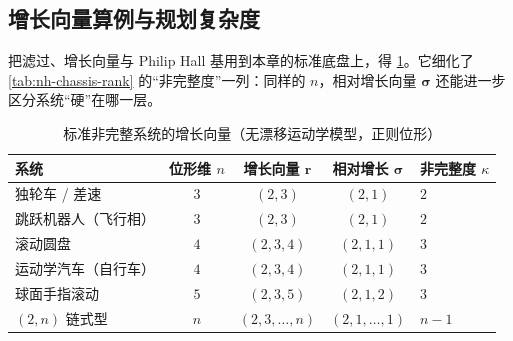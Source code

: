 \subsection{增长向量算例与规划复杂度}
\label{sec:nh-growth-examples}

把滤过、增长向量与 Philip Hall 基用到本章的标准底盘上，得 \cref{tab:nh-growth}。它细化了 \cref{tab:nh-chassis-rank} 的“非完整度”一列：同样的 $n$，相对增长向量 $\boldsymbol\sigma$ 还能进一步区分系统“硬”在哪一层。

\begin{table}[H]\centering\small
\caption{标准非完整系统的增长向量（无漂移运动学模型，正则位形）}
\label{tab:nh-growth}
\begin{tabular}{lcccl}
\toprule
系统 & 位形维 $n$ & 增长向量 $\mathbf r$ & 相对增长 $\boldsymbol\sigma$ & 非完整度 $\kappa$ \\
\midrule
独轮车 / 差速 & $3$ & $(2,3)$ & $(2,1)$ & $2$ \\
跳跃机器人（飞行相） & $3$ & $(2,3)$ & $(2,1)$ & $2$ \\
滚动圆盘 & $4$ & $(2,3,4)$ & $(2,1,1)$ & $3$ \\
运动学汽车（自行车） & $4$ & $(2,3,4)$ & $(2,1,1)$ & $3$ \\
球面手指滚动 & $5$ & $(2,3,5)$ & $(2,1,2)$ & $3$ \\
$(2,n)$ 链式型 & $n$ & $(2,3,\dots,n)$ & $(2,1,\dots,1)$ & $n-1$ \\
\bottomrule
\end{tabular}
\end{table}

